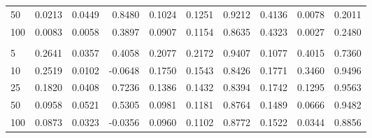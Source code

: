 \begin{table}
\begin{tabular}{lrrrrrrrrr}
50 & 0.0213 & 0.0449 & 0.8480 & 0.1024 & 0.1251 & 0.9212 & 0.4136 & 0.0078 & 0.2011 \\
100 & 0.0083 & 0.0058 & 0.3897 & 0.0907 & 0.1154 & 0.8635 & 0.4323 & 0.0027 & 0.2480 \\
\addlinespace
\multicolumn{10}{l}{\textit{Sin-Het}} \\
5 & 0.2641 & 0.0357 & 0.4058 & 0.2077 & 0.2172 & 0.9407 & 0.1077 & 0.4015 & 0.7360 \\
10 & 0.2519 & 0.0102 & -0.0648 & 0.1750 & 0.1543 & 0.8426 & 0.1771 & 0.3460 & 0.9496 \\
25 & 0.1820 & 0.0408 & 0.7236 & 0.1386 & 0.1432 & 0.8394 & 0.1742 & 0.1295 & 0.9563 \\
50 & 0.0958 & 0.0521 & 0.5305 & 0.0981 & 0.1181 & 0.8764 & 0.1489 & 0.0666 & 0.9482 \\
100 & 0.0873 & 0.0323 & -0.0356 & 0.0960 & 0.1102 & 0.8772 & 0.1522 & 0.0344 & 0.8856 \\
\bottomrule
\end{tabular}
\end{table}
